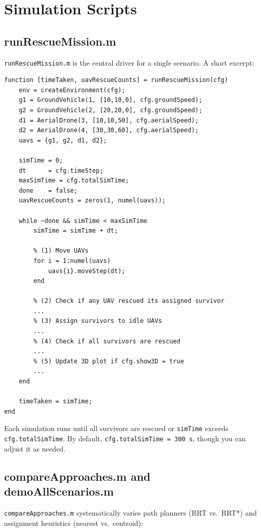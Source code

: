\documentclass[12pt,a4paper]{report}
\begin{document}
\section{Simulation Scripts}
\label{sec:simulation_scripts}

\subsection{runRescueMission.m}
\label{sec:run_rescue_mission}

\texttt{runRescueMission.m} is the central driver for a single scenario. A short excerpt:
\begin{verbatim}
function [timeTaken, uavRescueCounts] = runRescueMission(cfg)
    env = createEnvironment(cfg);
    g1 = GroundVehicle(1, [10,10,0], cfg.groundSpeed);
    g2 = GroundVehicle(2, [20,20,0], cfg.groundSpeed);
    d1 = AerialDrone(3, [10,10,50], cfg.aerialSpeed);
    d2 = AerialDrone(4, [30,30,60], cfg.aerialSpeed);
    uavs = {g1, g2, d1, d2};

    simTime = 0;
    dt      = cfg.timeStep;
    maxSimTime = cfg.totalSimTime;
    done    = false;
    uavRescueCounts = zeros(1, numel(uavs));

    while ~done && simTime < maxSimTime
        simTime = simTime + dt;

        % (1) Move UAVs
        for i = 1:numel(uavs)
            uavs{i}.moveStep(dt);
        end

        % (2) Check if any UAV rescued its assigned survivor
        ...
        % (3) Assign survivors to idle UAVs
        ...
        % (4) Check if all survivors are rescued
        ...
        % (5) Update 3D plot if cfg.show3D = true
        ...
    end

    timeTaken = simTime;
end
\end{verbatim}
Each simulation runs until all survivors are rescued or \texttt{simTime}
exceeds \texttt{cfg.totalSimTime}. By default, \texttt{cfg.totalSimTime = 300\,s},
though you can adjust it as needed.

\subsection{compareApproaches.m and demoAllScenarios.m}
\texttt{compareApproaches.m} systematically varies path planners (RRT vs.\ RRT*) and 
assignment heuristics (nearest vs.\ centroid):
\end{document}
